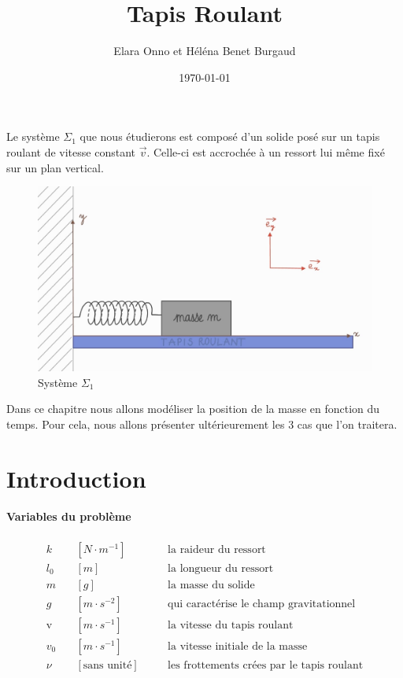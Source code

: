 \documentclass{article}
\title{Tapis Roulant}
\author{Elara Onno et Héléna Benet Burgaud}
\date{\today}
\begin{document}
\maketitle
\tableofcontents
\newpage

\noindent Le système $\Sigma_1$ que nous étudierons est composé d'un solide posé sur un tapis roulant de vitesse constant $\vec{v}$. Celle-ci est accrochée à un ressort lui même fixé sur un plan vertical. 

\begin{figure}[h!]
	\centering
	\includegraphics[scale=.26]{sch1.jpg}
	\caption{Système $\Sigma_1$}
\end{figure}
Dans ce chapitre nous allons modéliser la position de la masse en fonction du temps. Pour cela, nous allons présenter ultérieurement les 3 cas que l'on traitera.

\section{Introduction}\label{sec_1}
\paragraph{Variables du problème}\label{par_1.0.0.1}

\begin{adjustwidth}{0cm}{6cm}
\vspace{-.7cm}
\begin{alignat*}{2}
k \quad&[N\cdot m^{-1}] &&\quad \text{la raideur du ressort}\\
l_0  \quad&[m] &&\quad \text{la longueur du ressort} \\
m \quad&[g] && \quad\text{la masse du solide}\\
g \quad&[m\cdot s^{-2}] &&\quad \text{qui caractérise le champ gravitationnel} \\
\text{v} \quad& [m\cdot s^{-1}] && \quad\text{la vitesse du tapis roulant} \\
v_0 \quad& [m\cdot s^{-1}] && \quad\text{la vitesse initiale de la masse} \\
\nu \quad&[\text{sans unité}] && \quad\text{les frottements crées par le tapis roulant} 
\end{alignat*}
\end{adjustwidth}
\end{document}

